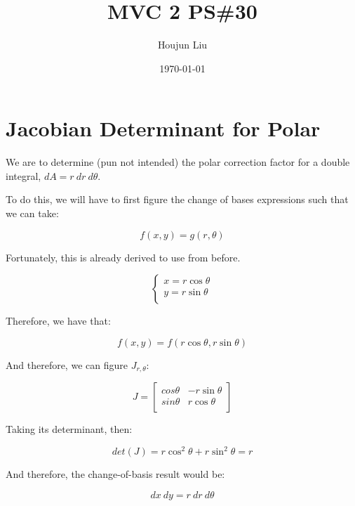 \documentclass[letterpaper]{article}
\author{Houjun Liu}
\date{\today}
\title{MVC 2 PS\#30}
\renewcommand{\tableofcontents}{}
\renewcommand\maketitle{}
\begin{document}
\maketitle
\tableofcontents


\section{Jacobian Determinant for Polar}
\label{sec:org9d2dab1}
We are to determine (pun not intended) the polar correction factor for a double integral, \(dA= r\ dr\ d\theta\).

To do this, we will have to first figure the change of bases expressions such that we can take:

\begin{equation}
   f(x,y) = g(r, \theta) 
\end{equation}

Fortunately, this is already derived to use from before.

\begin{equation}
   \begin{cases}
   x = r\cos\theta \\
   y = r\sin\theta \\
\end{cases}
\end{equation}

Therefore, we have that:

\begin{equation}
   f(x,y) = f(r\cos\theta, r\sin\theta) 
\end{equation}

And therefore, we can figure \(J_{r,\theta}\):

\begin{equation}
   J = \begin{bmatrix} 
cos\theta & -r\sin\theta \\
sin\theta & r\cos\theta \\
\end{bmatrix} 
\end{equation}

Taking its determinant, then:

\begin{equation}
   det(J) = r\cos^2\theta +r\sin^2\theta = r
\end{equation}

And therefore, the change-of-basis result would be:

\begin{equation}
   dx\ dy = r\ dr\ d\theta 
\end{equation}
\end{document}
